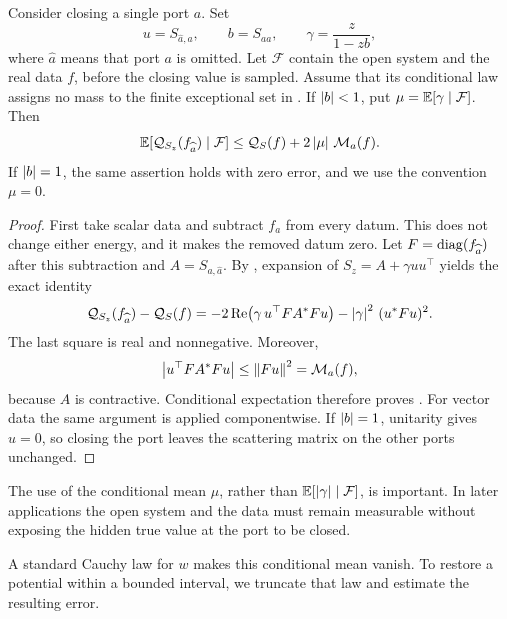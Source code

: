 \begin{lemma}
\label{mat:energy-closure}
Consider closing a single port $a$. Set
\[
 u=S_{\widehat a,a},\qquad b=S_{aa},\qquad
 \gamma=\frac{z}{1-zb},
\]
where $\widehat a$ means that port $a$ is omitted. Let $\mathcal F$
contain the open system and the real data $f$, before the closing value
is sampled. Assume that its conditional law assigns no mass to the
finite exceptional set in . If $\left\lvert b\right\rvert<1$, put
$\mu=\mathbb E[\gamma\mid\mathcal F]$. Then
\begin{equation}
 \mathbb E[\mathcal Q_{S_z}(f_{\widehat a})\mid\mathcal F]
 \le \mathcal Q_S(f)+2\left\lvert\mu\right\rvert\,\mathcal M_a(f).
 \label{mat:conditional-comparison}
\end{equation}
If $\left\lvert b\right\rvert=1$, the same assertion holds with zero error, and we use the
convention $\mu=0$.
\end{lemma}

\begin{proof}
First take scalar data and subtract $f_a$ from every datum. This does
not change either energy, and it makes the removed datum zero. Let
$F=\operatorname{diag}(f_{\widehat a})$ after this subtraction and
$A=S_{\widehat a,\widehat a}$. By , expansion of
$S_z=A+\gamma uu^\top$ yields the exact identity
\[
 \mathcal Q_{S_z}(f_{\widehat a})-\mathcal Q_S(f)
  =-2\operatorname{Re}\bigl(\gamma\,u^\top F A^*F u\bigr)
    -\left\lvert\gamma\right\rvert^2\,(u^*Fu)^2.
\]
The last square is real and nonnegative. Moreover,
\[
 \left\lvert u^\top F A^*Fu\right\rvert\le\left\lVert Fu\right\rVert^2=\mathcal M_a(f),
\]
because $A$ is contractive. Conditional expectation therefore proves
. For vector data the same argument is
applied componentwise. If $\left\lvert b\right\rvert=1$, unitarity gives $u=0$, so closing
the port leaves the scattering matrix on the other ports unchanged.
\end{proof}

The use of the conditional mean $\mu$, rather than
$\mathbb E[\left\lvert\gamma\right\rvert\mid\mathcal F]$, is important. In later applications the
open system and the data must remain measurable without exposing the
hidden true value at the port to be closed.

A standard Cauchy law for $w$ makes this conditional mean vanish. To
restore a potential within a bounded interval, we truncate that law and
estimate the resulting error.

